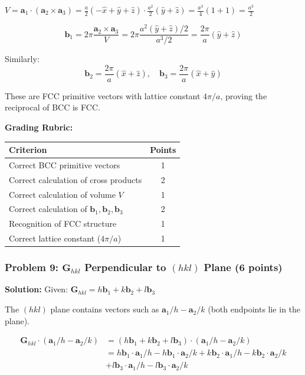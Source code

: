 \documentclass[12pt,a4paper]{article}
\begin{document}
$V = \mathbf{a}_1 \cdot (\mathbf{a}_2 \times \mathbf{a}_3) = \frac{a}{2}(-\hat{x} + \hat{y} + \hat{z}) \cdot \frac{a^2}{2}(\hat{y} + \hat{z}) = \frac{a^3}{4}(1+1) = \frac{a^3}{2}$

\[\mathbf{b}_1 = 2\pi \frac{\mathbf{a}_2 \times \mathbf{a}_3}{V} = 2\pi \frac{a^2(\hat{y} + \hat{z})/2}{a^3/2} = \frac{2\pi}{a}(\hat{y} + \hat{z})\]

Similarly:
\[\mathbf{b}_2 = \frac{2\pi}{a}(\hat{x} + \hat{z}), \quad \mathbf{b}_3 = \frac{2\pi}{a}(\hat{x} + \hat{y})\]

These are FCC primitive vectors with lattice constant $4\pi/a$, proving the reciprocal of BCC is FCC.

\textbf{Grading Rubric:}
\begin{table}[h]
\centering
\begin{tabular}{|p{10cm}|c|}
\hline
\textbf{Criterion} & \textbf{Points} \\
\hline
Correct BCC primitive vectors & 1 \\
Correct calculation of cross products & 2 \\
Correct calculation of volume $V$ & 1 \\
Correct calculation of $\mathbf{b}_1, \mathbf{b}_2, \mathbf{b}_3$ & 2 \\
Recognition of FCC structure & 1 \\
Correct lattice constant ($4\pi/a$) & 1 \\
\hline
\end{tabular}
\end{table}

\subsubsection*{Problem 9: $\mathbf{G}_{hkl}$ Perpendicular to $(hkl)$ Plane (6 points)}
\textbf{Solution:}
Given: $\mathbf{G}_{hkl} = h\mathbf{b}_1 + k\mathbf{b}_2 + l\mathbf{b}_3$

The $(hkl)$ plane contains vectors such as $\mathbf{a}_1/h - \mathbf{a}_2/k$ (both endpoints lie in the plane).

\begin{align*}
\mathbf{G}_{hkl} \cdot (\mathbf{a}_1/h - \mathbf{a}_2/k) &= (h\mathbf{b}_1 + k\mathbf{b}_2 + l\mathbf{b}_3) \cdot (\mathbf{a}_1/h - \mathbf{a}_2/k) \\
&= h\mathbf{b}_1 \cdot \mathbf{a}_1/h - h\mathbf{b}_1 \cdot \mathbf{a}_2/k + k\mathbf{b}_2 \cdot \mathbf{a}_1/h - k\mathbf{b}_2 \cdot \mathbf{a}_2/k \\
&+ l\mathbf{b}_3 \cdot \mathbf{a}_1/h - l\mathbf{b}_3 \cdot \mathbf{a}_2/k
\end{align*}
\end{document}
